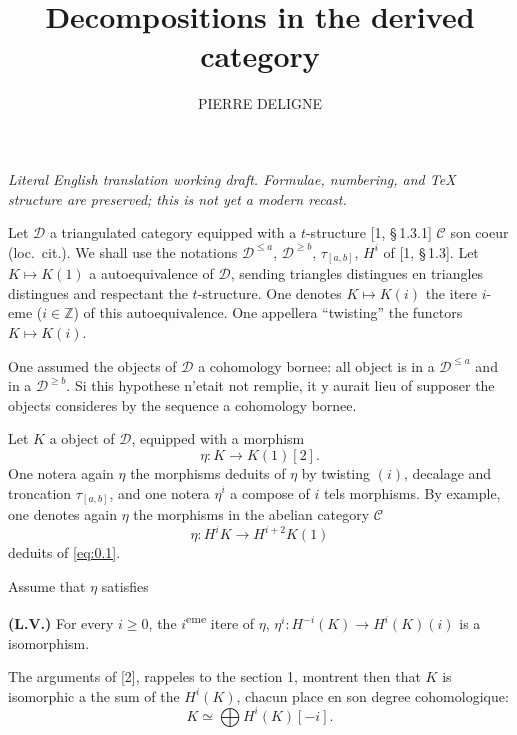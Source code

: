 \documentclass[11pt,a4paper]{article}
\title{Decompositions in the derived category}
\author{PIERRE DELIGNE}
\date{}
\theoremstyle{plain}
\theoremstyle{definition}
\newcommand{\cD}{\mathscr{D}}
\newcommand{\cC}{\mathscr{C}}
\begin{document}
\begin{center}\small\emph{Literal English translation working draft. Formulae, numbering, and TeX structure are preserved; this is not yet a modern recast.}\end{center}
\vspace{0.5em}

\maketitle
\thispagestyle{empty}

Let $\cD$ a triangulated category equipped with a $t$-structure [1, \S\,1.3.1] $\cC$ son coeur (loc.~cit.). We shall use the notations $\cD^{\leqslant a}$, $\cD^{\geqslant b}$, $\tau_{[a,b]}$, $H^i$ of [1, \S\,1.3]. Let $K \mapsto K(1)$ a autoequivalence of $\cD$, sending triangles distingues en triangles distingues and respectant the $t$-structure. One denotes $K \mapsto K(i)$ the itere $i$-eme ($i \in \mathbb{Z}$) of this autoequivalence. One appellera ``twisting'' the functors $K \mapsto K(i)$.

One assumed the objects of $\cD$ a cohomology bornee: all object is in a $\cD^{\leqslant a}$ and in a $\cD^{\geqslant b}$. Si this hypothese n'etait not remplie, it y aurait lieu of supposer the objects consideres by the sequence a cohomology bornee.

Let $K$ a object of $\cD$, equipped with a morphism
\begin{equation}\label{eq:0.1}
\eta \colon K \to K(1)[2].
\end{equation}
One notera again $\eta$ the morphisms deduits of $\eta$ by twisting $(i)$, decalage and troncation $\tau_{[a,b]}$, and one notera $\eta^i$ a compose of $i$ tels morphisms. By example, one denotes again $\eta$ the morphisms in the abelian category $\cC$
\begin{equation}\label{eq:0.2}
\eta \colon H^i K \to H^{i+2} K(1)
\end{equation}
deduits of \eqref{eq:0.1}.

Assume that $\eta$ satisfies

\smallskip
\noindent\textbf{(L.V.)} For every $i \geqslant 0$, the $i$\textsuperscript{eme} itere of $\eta$, $\eta^i \colon H^{-i}(K) \to H^i(K)(i)$ is a isomorphism.
\smallskip

The arguments of [2], rappeles to the section 1, montrent then that $K$ is isomorphic a the sum of the $H^i(K)$, chacun place en son degree cohomologique:
\begin{equation}\label{eq:0.3}
K \simeq \bigoplus H^i(K)[-i].
\end{equation}
\end{document}
